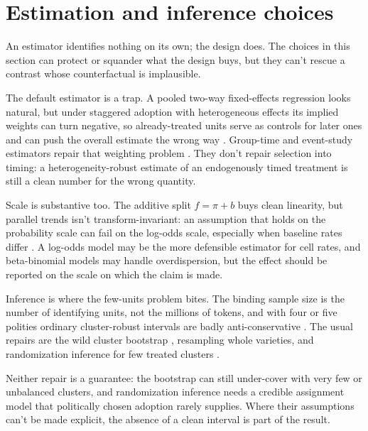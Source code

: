 \section{Estimation and inference choices}
\label{sec:modern}

An estimator identifies nothing on its own; the design does. The choices in this section can protect or squander what the design buys, but they can't rescue a contrast whose counterfactual is implausible.

The default estimator is a trap. A pooled two-way fixed-effects regression looks natural, but under staggered adoption with heterogeneous effects its implied weights can turn negative, so already-treated units serve as controls for later ones and can push the overall estimate the wrong way \citep{GoodmanBacon2021,deChaisemartin2020}. Group-time and event-study estimators repair that weighting problem \citep{CallawaySantAnna2021,SunAbraham2021,BorusyakJaravelSpiess2024}. They don't repair selection into timing: a heterogeneity-robust estimate of an endogenously timed treatment is still a clean number for the wrong quantity.

Scale is substantive too. The additive split $f = \pi + b$ buys clean linearity, but parallel trends isn't transform-invariant: an assumption that holds on the probability scale can fail on the log-odds scale, especially when baseline rates differ \citep{RothSantAnna2023}. A log-odds model may be the more defensible estimator for cell rates, and beta-binomial models may handle overdispersion, but the effect should be reported on the scale on which the claim is made.

Inference is where the few-units problem bites. The binding sample size is the number of identifying units, not the millions of tokens, and with four or five polities ordinary cluster-robust intervals are badly anti-conservative \citep{BertrandDufloMullainathan2004}. The usual repairs are the wild cluster bootstrap \citep{CameronGelbachMiller2008}, resampling whole varieties, and randomization inference for few treated clusters \citep{MacKinnonWebb2020}.

Neither repair is a guarantee: the bootstrap can still under-cover with very few or unbalanced clusters, and randomization inference needs a credible assignment model that politically chosen adoption rarely supplies. Where their assumptions can't be made explicit, the absence of a clean interval is part of the result.

